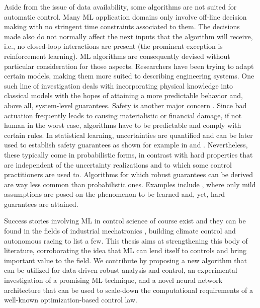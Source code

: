 Aside from the issue of data availability, some algorithms are not suited for automatic control. Many ML application domains only involve off-line decision making with no stringent time constraints associated to them. The decisions made also do not normally affect the next inputs that the algorithm will receive, i.e., no closed-loop interactions are present (the prominent exception is reinforcement learning). ML algorithms are consequently devised without particular consideration for those aspects. Researchers have been trying to adapt certain models, making them more suited to describing engineering systems. One such line of investigation deals with incorporating physical knowledge into classical models \citep{galimberti2021hamiltonian,di2022physically} with the hopes of attaining a more predictable behavior and, above all, system-level guarantees. Safety is another major concern \citep{hewing2020learning,brunke2022safe}. Since bad actuation frequently leads to causing materialistic or financial damage, if not human in the worst case, algorithms have to be predictable and comply with certain rules. In statistical learning, uncertainties are quantified and can be later used to establish safety guarantees as shown for example in \cite{hewing2019cautious} and \cite{lederer2022cooperative}. Nevertheless, these typically come in probabilistic forms, in contrast with hard properties that are independent of the uncertainty realizations and to which some control practitioners are used to. Algorithms for which robust guarantees can be derived are way less common than probabilistic ones. Examples include \cite{milanese2004set,sabug2021smgo}, where only mild assumptions are posed on the phenomenon to be learned and, yet, hard guarantees are attained.

Success stories involving ML in control science of course exist and they can be found in the fields of industrial mechatronics \citep{khosravi2022safety}, building climate control \citep{lian2021adaptive} and autonomous racing \citep{hewing2019cautious} to list a few. This thesis aims at strengthening this body of literature, corroborating the idea that ML can lend itself to controls and bring important value to the field. We contribute by proposing a new algorithm that can be utilized for data-driven robust analysis and control, an experimental investigation of a promising ML technique, and a novel neural network architecture that can be used to scale-down the computational requirements of a well-known optimization-based control law.


